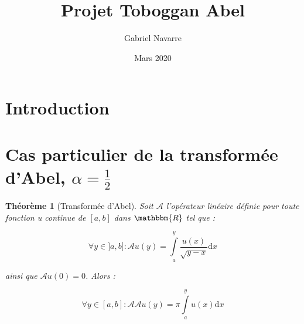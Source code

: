 \documentclass[french]{article}
\title{Projet Toboggan Abel}
\author{Gabriel Navarre}
\date{Mars 2020}
\begin{document}
\maketitle

\section{Introduction}


\section{Cas particulier de la transformée d'Abel, $\alpha = \frac{1}{2}$ }
\newtheorem{thmv}{Théorème}
\begin{thmv}[Transformée d'Abel]
Soit $\mathcal{A}$ l'opérateur linéaire définie pour toute fonction u continue de $[a,b]$ dans $\mathbbm{R}$ tel que :\newline
\begin{center}
    \begin{equation}
        \forall y \in ]a,b] : \mathcal{A}u(y)=\int\limits_{a}^{y}\frac{u(x)}{\sqrt{y-x}}\mathrm{d}x
    \end{equation}
\end{center}
ainsi que $\mathcal{A}u(0) = 0$. Alors :
\begin{center}
    \begin{equation}
        \forall y \in [a,b] : \mathcal{A}\mathcal{A}u(y)=\pi\int\limits_{a}^{y}u(x)\mathrm{d}x
    \end{equation}
\end{center}
\end{thmv}
\end{document}

